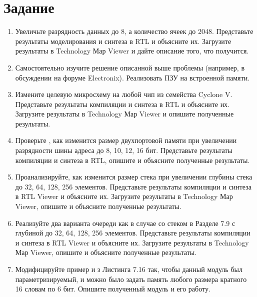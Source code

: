 \documentclass[a4paper,14pt]{article}
\begin{document}
	
	\tableofcontents
	\pagebreak
	\section{Задание}
	
	\begin{enumerate}
		\item Увеличьте разрядность данных до 8, а количество ячеек до 2048. Представьте результаты
		моделирования и синтеза в RTL и объясните их. Загрузите результаты в Technology Мар
		Viewer и дайте описание того, что получится.
		
		\item Самостоятельно изучите решение описанной выше проблемы (например, в обсуждении на
		форуме Electronix). Реализовать ПЗУ на встроенной памяти.
		
		\item Измените целевую микросхему на любой чип из семейства Cyclone V. Представьте
		результаты компиляции и синтеза в RTL и объясните их. Загрузите результаты в Technology
		Мар Viewer и опишите полученные результаты.
		
		\item Проверьте , как изменится размер двухпортовой памяти при увеличении разрядности шины
		адреса до 8, 10, 12, 16 бит. Представьте результаты компиляции и синтеза в RTL, опишите и
		объясните полученные результаты.
		
		\item Проанализируйте, как изменится размер стека при увеличении глубины стека до 32, 64, 128,
		256 элементов. Представьте результаты компиляции и синтеза в RTL Viewer и объясните их.
		Загрузите результаты в Technology Мар Viewer, опишите и объясните полученные
		результаты.
		
		\item Реализуйте два варианта очереди как в случае со стеком в Разделе 7.9 с глубиной до 32, 64,
		128, 256 элементов. Представьте результаты компиляции и синтеза в RTL Viewer и объясните
		их. Загрузите результаты в Technology Мар Viewer, опишите и объясните полученные
		результаты.
		
		\item Модифицируйте пример и з Листинга 7.16 так, чтобы данный модуль был
		параметризируемый, и можно было задать память любого размера кратного 16 словам по 6
		бит. Опишите полученный модуль и его работу.
	\end{enumerate}
	
\end{document}
